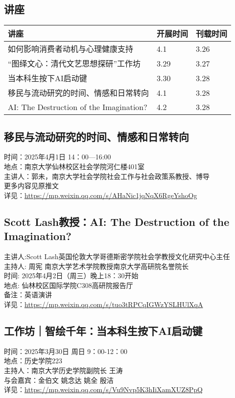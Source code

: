 \documentclass[letterpaper, 12pt]{article}
\begin{document}
\begin{multicols}{2}
\pagebreak

\section{讲座}
\begin{tabular}{|>{\centering\arraybackslash}m{}|m{}|m{}|}
    \hline
    讲座 & 开展时间 & 刊载时间\\
    \hline\hline
    如何影响消费者动机与心理健康支持 & 4.1 & 3.26\\\hline
    “图绎文心：清代文艺思想探研”工作坊 & 3.29 & 3.27\\\hline
    当本科生按下AI启动键 & 3.30 & 3.28\\\hline
    移民与流动研究的时间、情感和日常转向 & 4.1 & 3.28\\\hline
    AI: The Destruction of the Imagination? & 4.2 & 3.28\\\hline
\end{tabular}
\subsection{移民与流动研究的时间、情感和日常转向}
时间：2025年4月1日 14：00—16:00
\\地点：南京大学仙林校区社会学院河仁楼401室
\\主讲人：郭未，南京大学社会学院社会工作与社会政策系教授、博导
\\更多内容见原推文
\\详见：\url{https://mp.weixin.qq.com/s/AHaNic1jqNqX6RgeYshoOg}

\subsection{Scott Lash教授：AI: The Destruction of the Imagination?}
主讲人:Scott Lash英国伦敦大学哥德斯密学院社会学教授文化研究中心主任
\\主持人: 周宪 南京大学艺术学院教授南京大学高研院名誉院长
\\时间:  2025年4月2日（周三）晚上18：30开始
\\地点:  仙林校区国际学院C308高研院报告厅
\\备注：英语演讲
\\详见：\url{https://mp.weixin.qq.com/s/tuo3tRPCqIGWzYSLHUlXqA}

\subsection{工作坊｜智绘千年：当本科生按下AI启动键}
时间：2025年3月30日 周日 9：00-12：00
\\地点：历史学院223
\\主持人：南京大学历史学院副院长 王涛
\\与会嘉宾：金伯文 姚念达 姚全 殷洁
\\详见：\url{https://mp.weixin.qq.com/s/Vu9Nvp5K3hIiXamXUZ8PpQ}


\end{multicols}
\end{document}
